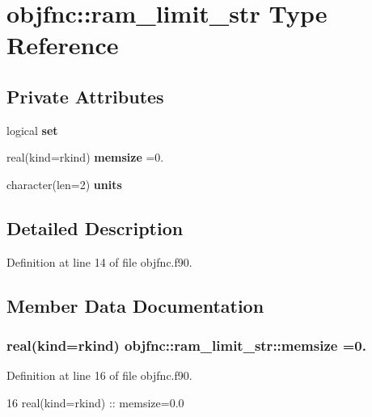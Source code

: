 \section{objfnc\+:\+:ram\+\_\+limit\+\_\+str Type Reference}
\label{structobjfnc_1_1ram__limit__str}
\subsection*{Private Attributes}
\begin{DoxyCompactItemize}
\item 
logical {\bf set}
\item 
real(kind=rkind) {\bf memsize} =0.
\item 
character(len=2) {\bf units}
\end{DoxyCompactItemize}


\subsection{Detailed Description}


Definition at line 14 of file objfnc.\+f90.



\subsection{Member Data Documentation}
\subsubsection[{memsize}]{\setlength{\rightskip}{0pt plus 5cm}real(kind=rkind) objfnc\+::ram\+\_\+limit\+\_\+str\+::memsize =0.\hspace{0.3cm}{\ttfamily [private]}}\label{structobjfnc_1_1ram__limit__str_a2c7eaca9536d94c90efe1a3b090ceda8}


Definition at line 16 of file objfnc.\+f90.


\begin{DoxyCode}
16     \textcolor{keywordtype}{real(kind=rkind)} :: memsize=0.0
\end{DoxyCode}
